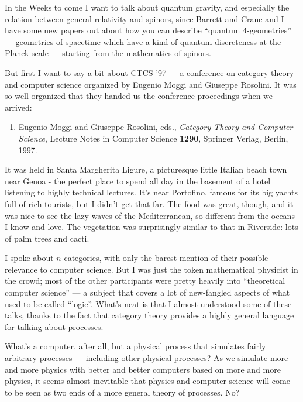 \documentclass{article}
\def\tightlist{}
\begin{document}
In the Weeks to come I want to talk about quantum gravity, and
especially the relation between general relativity and spinors, since
Barrett and Crane and I have some new papers out about how you can
describe ``quantum 4-geometries'' --- geometries of spacetime which have
a kind of quantum discreteness at the Planck scale --- starting from the
mathematics of spinors.

But first I want to say a bit about CTCS '97 --- a conference on
category theory and computer science organized by Eugenio Moggi and
Giuseppe Rosolini. It was so well-organized that they handed us the
conference proceedings when we arrived:

\begin{enumerate}
\def\labelenumi{\arabic{enumi})}
\tightlist
\item
  Eugenio Moggi and Giuseppe Rosolini, eds., \emph{Category Theory and
  Computer Science}, Lecture Notes in Computer Science \textbf{1290},
  Springer Verlag, Berlin, 1997.
\end{enumerate}

It was held in Santa Margherita Ligure, a picturesque little Italian
beach town near Genoa - the perfect place to spend all day in the
basement of a hotel listening to highly technical lectures. It's near
Portofino, famous for its big yachts full of rich tourists, but I didn't
get that far. The food was great, though, and it was nice to see the
lazy waves of the Mediterranean, so different from the oceans I know and
love. The vegetation was surprisingly similar to that in Riverside: lots
of palm trees and cacti.

I spoke about \(n\)-categories, with only the barest mention of their
possible relevance to computer science. But I was just the token
mathematical physicist in the crowd; most of the other participants were
pretty heavily into ``theoretical computer science'' --- a subject that
covers a lot of new-fangled aspects of what used to be called ``logic''.
What's neat is that I almost understood some of these talks, thanks to
the fact that category theory provides a highly general language for
talking about processes.

What's a computer, after all, but a physical process that simulates
fairly arbitrary processes --- including other physical processes? As we
simulate more and more physics with better and better computers based on
more and more physics, it seems almost inevitable that physics and
computer science will come to be seen as two ends of a more general
theory of processes. No?
\end{document}
